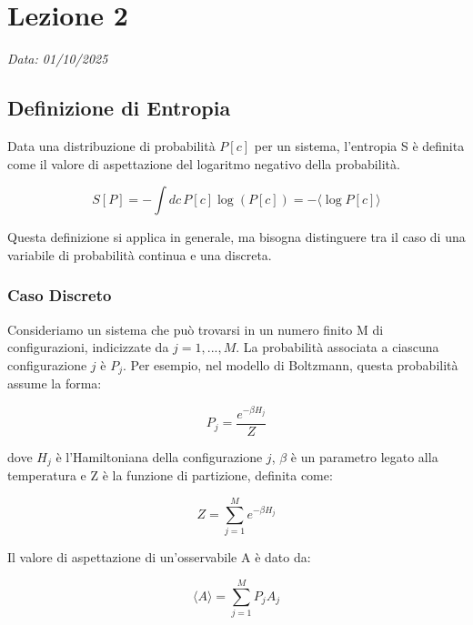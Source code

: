 \chapter{Lezione 2}
\label{chap:lezione_02} 

\begin{flushright}
\textit{Data: 01/10/2025}
\end{flushright}


\section{Definizione di Entropia}

Data una distribuzione di probabilità $P[c]$ per un sistema, l'entropia S è definita come il valore di aspettazione del logaritmo negativo della probabilità.

\begin{equation}
S[P] = - \int dc \, P[c] \log(P[c]) = -\langle \log P[c] \rangle
\end{equation}

Questa definizione si applica in generale, ma bisogna distinguere tra il caso di una variabile di probabilità continua e una discreta.

\subsection{Caso Discreto}

Consideriamo un sistema che può trovarsi in un numero finito M di configurazioni, indicizzate da $j = 1, ..., M$. La probabilità associata a ciascuna configurazione $j$ è $P_j$. Per esempio, nel modello di Boltzmann, questa probabilità assume la forma:

\begin{equation}
P_j = \frac{e^{-\beta H_j}}{Z}
\end{equation}

dove $H_j$ è l'Hamiltoniana della configurazione $j$, $\beta$ è un parametro legato alla temperatura e Z è la funzione di partizione, definita come:

\begin{equation}
Z = \sum_{j=1}^{M} e^{-\beta H_j}
\end{equation}

Il valore di aspettazione di un'osservabile A è dato da:

\begin{equation}
\langle A \rangle = \sum_{j=1}^{M} P_j A_j
\end{equation}

